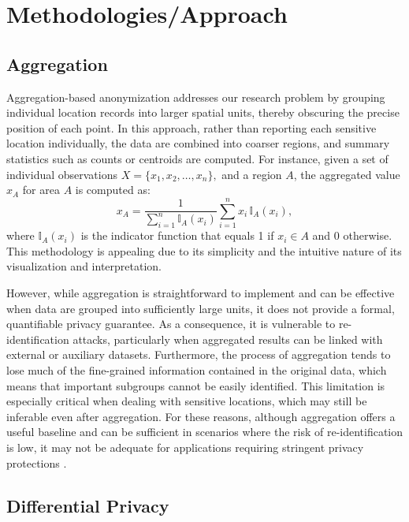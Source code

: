 \documentclass[twocolumn]{article}
\begin{document}
\section{Methodologies/Approach} \label{Methods}


\subsection{Aggregation}

Aggregation-based anonymization addresses our research problem by grouping individual location records into larger spatial units, thereby obscuring the precise position of each point. In this approach, rather than reporting each sensitive location individually, the data are combined into coarser regions, and summary statistics such as counts or centroids are computed. For instance, given a set of individual observations 
\(
X = \{x_1, x_2, \ldots, x_n\},
\)
and a region \(A\), the aggregated value \(x_A\) for area \(A\) is computed as:
\[
x_A = \frac{1}{\sum_{i=1}^{n} \mathbb{I}_{A}(x_i)}\sum_{i=1}^{n} x_i\, \mathbb{I}_{A}(x_i),
\]
where \(\mathbb{I}_{A}(x_i)\) is the indicator function that equals 1 if \(x_i \in A\) and 0 otherwise. This methodology is appealing due to its simplicity and the intuitive nature of its visualization and interpretation.

However, while aggregation is straightforward to implement and can be effective when data are grouped into sufficiently large units, it does not provide a formal, quantifiable privacy guarantee. As a consequence, it is vulnerable to re-identification attacks, particularly when aggregated results can be linked with external or auxiliary datasets. Furthermore, the process of aggregation tends to lose much of the fine-grained information contained in the original data, which means that important subgroups cannot be easily identified. This limitation is especially critical when dealing with sensitive locations, which may still be inferable even after aggregation. For these reasons, although aggregation offers a useful baseline and can be sufficient in scenarios where the risk of re-identification is low, it may not be adequate for applications requiring stringent privacy protections \cite{sweeney2002}.



\subsection{Differential Privacy}
\end{document}
